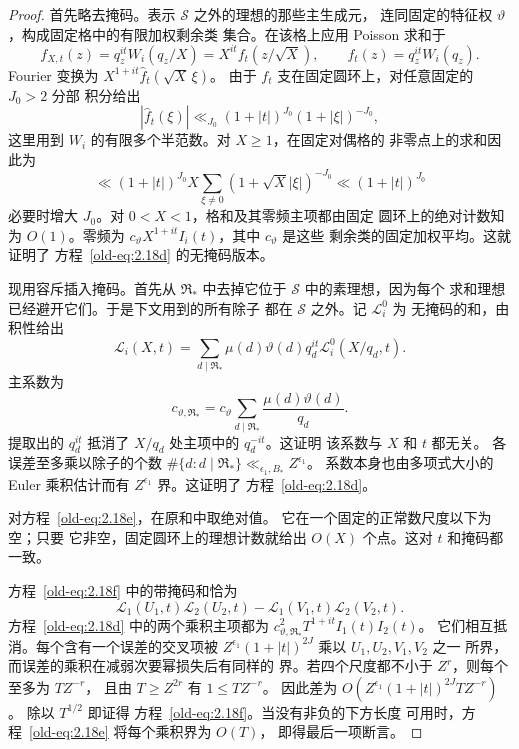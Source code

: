 \begin{proof}
首先略去掩码。表示 \(\mathcal S\) 之外的理想的那些主生成元，
连同固定的特征权
\(\vartheta\)，构成固定格中的有限加权剩余类
集合。在该格上应用 Poisson 求和于
\[
 f_{X,t}(z)=q_z^{it}W_i(q_z/X)
           =X^{it}f_t(z/\sqrt X),\qquad
 f_t(z)=q_z^{it}W_i(q_z).
\]
Fourier 变换为
\(X^{1+it}\widehat f_t(\sqrt X\,\xi)\)。
由于 \(f_t\) 支在固定圆环上，对任意固定的 \(J_0>2\) 分部
积分给出
\[
 |\widehat f_t(\xi)|
 \ll_{J_0} (1+|t|)^{J_0}(1+|\xi|)^{-J_0},
\]
这里用到 \(W_i\) 的有限多个半范数。对 \(X\ge1\)，在固定对偶格的
非零点上的求和因此为
\[
 \ll (1+|t|)^{J_0} X
       \sum_{\xi\ne0}(1+\sqrt X|\xi|)^{-J_0}
 \ll (1+|t|)^{J_0}
\]
必要时增大 \(J_0\)。对 \(0<X<1\)，格和及其零频主项都由固定
圆环上的绝对计数知为 \(O(1)\)。零频为
\(c_\vartheta X^{1+it}I_i(t)\)，其中 \(c_\vartheta\) 是这些
剩余类的固定加权平均。这就证明了
方程~\eqref{old-eq:2.18d} 的无掩码版本。

现用容斥插入掩码。首先从
\(\mathfrak R_*\) 中去掉它位于 \(\mathcal S\) 中的素理想，因为每个
求和理想已经避开它们。于是下文用到的所有除子
都在 \(\mathcal S\) 之外。记 \(\mathcal L_i^0\) 为
无掩码的和，由积性给出
\[
 \mathcal L_i(X,t)
 =\sum_{d\mid\mathfrak R_*}
       \mu(d)\vartheta(d)q_d^{it}\mathcal L_i^0(X/q_d,t).
\]
主系数为
\[
 c_{\vartheta,\mathfrak R_*}
 =c_\vartheta\sum_{d\mid\mathfrak R_*}
             \frac{\mu(d)\vartheta(d)}{q_d}.
\]
提取出的 \(q_d^{it}\) 抵消了
\(X/q_d\) 处主项中的 \(q_d^{-it}\)。这证明
该系数与 \(X\) 和 \(t\) 都无关。
各误差至多乘以除子的个数
\(\#\{d:d\mid\mathfrak R_*\}\ll_{\epsilon_1,B_*}Z^{\epsilon_1}\)。
系数本身也由多项式大小的 Euler 乘积估计而有
\(Z^{\epsilon_1}\) 界。这证明了
方程~\eqref{old-eq:2.18d}。

对方程~\eqref{old-eq:2.18e}，在原和中取绝对值。
它在一个固定的正常数尺度以下为空；只要
它非空，固定圆环上的理想计数就给出 \(O(X)\)
个点。这对 \(t\) 和掩码都一致。

方程~\eqref{old-eq:2.18f} 中的带掩码和恰为
\[
 \mathcal L_1(U_1,t)\mathcal L_2(U_2,t)
 -\mathcal L_1(V_1,t)\mathcal L_2(V_2,t).
\]
方程~\eqref{old-eq:2.18d} 中的两个乘积主项都为
\(c_{\vartheta,\mathfrak R_*}^2T^{1+it}I_1(t)I_2(t)\)。
它们相互抵消。每个含有一个误差的交叉项被
\(Z^{\epsilon_1}(1+|t|)^{2J}\) 乘以 \(U_1,U_2,V_1,V_2\) 之一
所界，而误差的乘积在减弱次要幂损失后有同样的
界。若四个尺度都不小于 \(Z^r\)，则每个至多为 \(TZ^{-r}\)，
且由 \(T\ge Z^{2r}\) 有 \(1\le TZ^{-r}\)。
因此差为
\(O(Z^{\epsilon_1}(1+|t|)^{2J}TZ^{-r})\)。
除以 \(T^{1/2}\) 即证得
方程~\eqref{old-eq:2.18f}。当没有非负的下方长度
可用时，方程~\eqref{old-eq:2.18e} 将每个乘积界为 \(O(T)\)，
即得最后一项断言。
\end{proof}

